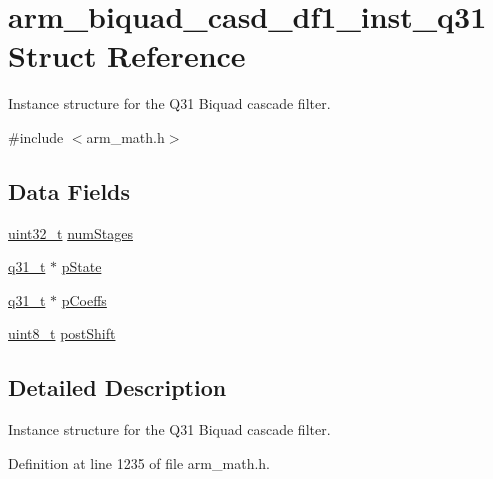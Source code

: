 \hypertarget{structarm__biquad__casd__df1__inst__q31}{\section{arm\-\_\-biquad\-\_\-casd\-\_\-df1\-\_\-inst\-\_\-q31 Struct Reference}
\label{structarm__biquad__casd__df1__inst__q31}
}


Instance structure for the Q31 Biquad cascade filter.  




{\ttfamily \#include $<$arm\-\_\-math.\-h$>$}

\subsection*{Data Fields}
\begin{DoxyCompactItemize}
\item 
\hyperlink{stdint_8h_a435d1572bf3f880d55459d9805097f62}{uint32\-\_\-t} \hyperlink{structarm__biquad__casd__df1__inst__q31_a2c2b579f1df1d8273a5d9d945c27e1b2}{num\-Stages}
\item 
\hyperlink{arm__math_8h_adc89a3547f5324b7b3b95adec3806bc0}{q31\-\_\-t} $\ast$ \hyperlink{structarm__biquad__casd__df1__inst__q31_a5dcf4727f58eb4e8e8b392508d8657bb}{p\-State}
\item 
\hyperlink{arm__math_8h_adc89a3547f5324b7b3b95adec3806bc0}{q31\-\_\-t} $\ast$ \hyperlink{structarm__biquad__casd__df1__inst__q31_aa62366c632f3b5305086f841f079dbd2}{p\-Coeffs}
\item 
\hyperlink{stdint_8h_aba7bc1797add20fe3efdf37ced1182c5}{uint8\-\_\-t} \hyperlink{structarm__biquad__casd__df1__inst__q31_a636c7fbe09ec4bef0bc0a4b4e2151cbe}{post\-Shift}
\end{DoxyCompactItemize}


\subsection{Detailed Description}
Instance structure for the Q31 Biquad cascade filter. 

Definition at line 1235 of file arm\-\_\-math.\-h.



